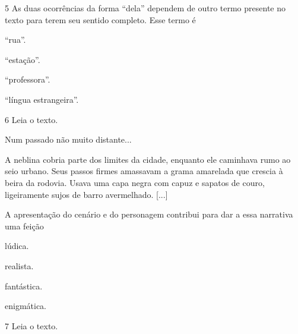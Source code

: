 \num{5} As duas ocorrências da forma ``dela'' dependem de outro
termo presente no texto para terem seu sentido completo. Esse termo é

\begin{escolha}
\item ``rua''.

\item ``estação''.

\item ``professora''.

\item ``língua estrangeira''.
\end{escolha}

\pagebreak

\num{6} Leia o texto.

\begin{myquote}
Num passado não muito distante...

A neblina cobria parte dos limites da cidade, enquanto ele caminhava
rumo ao seio urbano. Seus passos firmes amassavam a grama amarelada que
crescia à beira da rodovia. Usava uma capa negra com capuz e sapatos de
couro, ligeiramente sujos de barro avermelhado. {[}...{]}

\end{myquote}

A apresentação do cenário e do personagem contribui para dar a essa narrativa uma feição

\begin{multicols}{2}
\begin{escolha}
\item lúdica.

\item realista.

\item fantástica.

\item enigmática.
\end{escolha}
\end{multicols}

\num{7} Leia o texto.

